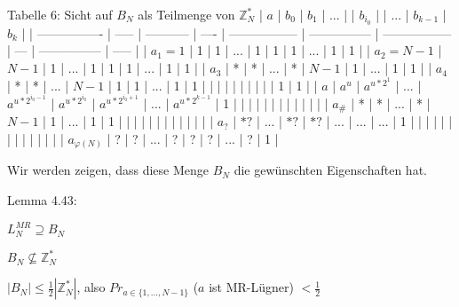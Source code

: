 \documentclass[a4paper]{article}
\begin{document}
\begin{multicols}{3}
        Tabelle 6: Sicht auf $B_N$ als Teilmenge von $\mathbb{Z}^*_N$
        | $a$              | $b_0$ | $b_1$       | ...  |                   | $b_{i_0}$       |                   | ... | $b_{k-1}$       | $b_k$ |
        | ---------------- | ----- | ----------- | ---- | ----------------- | --------------- | ----------------- | --- | --------------- | ----- |
        | $a_1=1$          | 1     | 1           | ...  | 1                 | 1               | 1                 | ... | 1               | 1     |
        | $a_2=N-1$        | $N-1$ | 1           | ...  | 1                 | 1               | 1                 | ... | 1               | 1     |
        | $a_3$            | *     | *           | ...  | *                 | $N-1$           | 1                 | ... | 1               | 1     |
        | $a_4$            | *     | *           | ...  | $N-1$             | 1               | 1                 | ... | 1               | 1     |
        |                  |       |             |      |                   |                 |                   |     | 1               | 1     |
        | $a$              | $a^u$ | $a^{u*2^1}$ | ...  | $a^{u*2^{i_0-1}}$ | $a^{u*2^{i_0}}$ | $a^{u*2^{i_0+1}}$ | ... | $a^{u*2^{k-1}}$ | 1     |
        |                  |       |             |      |                   |                 |                   |     |                 |       |
        | $a_{\#}$            | *     | *           | ...  | *                 | $N-1$           | 1                 | ... | 1               | 1     |
        |                  |       |             |      |                   |                 |                   |     |                 |       |
        | $a_?$            | $*?$  | ...         | $*?$ | $*?$              | ...             | ...               | ... | 1               |       |
        |                  |       |             |      |                   |                 |                   |     |                 |       |
        | $a_{\varphi(N)}$ | ?     | ?           | ...  | ?                 | ?               | ?                 | ... | ?               | 1     |


        Wir werden zeigen, dass diese Menge $B_N$ die gewünschten Eigenschaften hat.

        Lemma 4.43:
        \begin{enumerate*}
            \item  $L^{MR}_N \supseteq B_N$
            \item  $B_N \not\subseteq \mathbb{Z}^*_N$
            \item  $|B_N|\leq \frac{1}{2} | \mathbb{Z}^*_N|$, also $Pr_{a\in\{1,...,N-1\}}$ ($a$ ist MR-Lügner) $<\frac{1}{2}$
        \end{enumerate*}


\end{multicols}
\end{document}
